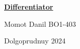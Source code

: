 \documentclass[a4paper,12pt]{article} %
\begin{document}
    \begin{titlepage}
    {\huge
    \begin{center}
    \underline{{\bf Differentiator}}
    \vspace{1cm}
    
    \end{center}
    }
    \vspace{2cm}
    \begin{center}
    
    
    {\LARGE Momot Danil
    \vspace{0.2cm}
    BO1-403}
    \end{center}
    \vspace{9.5cm}
    \begin{center}
        Dolgoprudnuy 2024
    \end{center}
    \end{titlepage}
\end{document}
